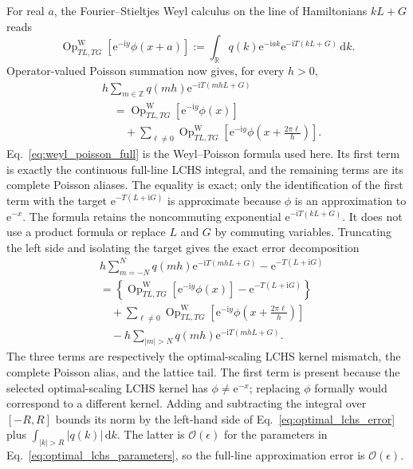 \documentclass[aps,pra,reprint,floatfix,unsortedaddress,superscriptaddress]{revtex4-2}
\newcommand{\abs}[1]{\left\lvert#1\right\rvert}
\newcommand{\Ocal}{\mathcal{O}}
\begin{document}
For real $a$, the Fourier--Stieltjes Weyl calculus on the line of
Hamiltonians $kL+G$ reads
\begin{equation}
\operatorname{Op}^{\mathrm W}_{TL,TG}
\!\left[\mathrm e^{-\mathrm iy}\phi(x+a)\right]
:=
\int_{\mathbb R}q(k)\mathrm e^{-\mathrm iak}
\mathrm e^{-\mathrm iT(kL+G)}\,\mathrm dk.
\label{eq:weyl_fourier_class}
\end{equation}
Operator-valued Poisson summation now gives, for every $h>0$,
\begin{align}
&h\sum_{m\in\mathbb Z}
q(mh)\mathrm e^{-\mathrm iT(mhL+G)}
\nonumber\\
&\quad=
\operatorname{Op}^{\mathrm W}_{TL,TG}
\!\left[\mathrm e^{-\mathrm iy}\phi(x)\right]
\nonumber\\
&\qquad+
\sum_{\ell\ne0}
\operatorname{Op}^{\mathrm W}_{TL,TG}
\!\left[
\mathrm e^{-\mathrm iy}
\phi\!\left(x+\frac{2\pi\ell}{h}\right)
\right].
\label{eq:weyl_poisson_full}
\end{align}
Eq.~\eqref{eq:weyl_poisson_full} is the Weyl--Poisson formula used
here.  Its first term is exactly the continuous full-line LCHS integral,
and the remaining terms are its complete Poisson aliases.  The equality
is exact; only the identification of the first term with the target
$\mathrm e^{-T(L+\mathrm iG)}$ is approximate because $\phi$ is an
approximation to $\mathrm e^{-x}$.
The formula retains the noncommuting exponential
$\mathrm e^{-\mathrm iT(kL+G)}$.  It does not use a product formula or
replace $L$ and $G$ by commuting variables.  Truncating the left side
and isolating the target gives the exact error decomposition
\begin{align}
    &h\sum_{m=-N}^{N}
    q(mh)\mathrm e^{-\mathrm iT(mhL+G)}
    -\mathrm e^{-T(L+\mathrm iG)}
    \nonumber\\
    &=
    \left\{
    \operatorname{Op}^{\mathrm W}_{TL,TG}
    \!\left[\mathrm e^{-\mathrm iy}\phi(x)\right]
    -\mathrm e^{-T(L+\mathrm iG)}
    \right\}
    \nonumber\\
    &\quad+
    \sum_{\ell\ne0}
    \operatorname{Op}^{\mathrm W}_{TL,TG}
    \!\left[
        \mathrm e^{-\mathrm iy}
        \phi\!\left(x+\frac{2\pi\ell}{h}\right)
    \right]
    \nonumber\\
    &\quad-
    h\sum_{\abs{m}>N}
    q(mh)\mathrm e^{-\mathrm iT(mhL+G)}.
    \label{eq:weyl_poisson_exact}
\end{align}
The three terms are respectively the optimal-scaling LCHS kernel
mismatch, the complete Poisson alias, and the lattice tail.  The first term is present
because the selected optimal-scaling LCHS kernel has
$\phi\neq\mathrm e^{-x}$; replacing $\phi$ formally would correspond to
a different kernel.  Adding and subtracting the integral over $[-R,R]$
bounds its norm by the left-hand side of
Eq.~\eqref{eq:optimal_lchs_error} plus
$\int_{\abs{k}>R}\abs{q(k)}\,\mathrm dk$.  The latter is
$\Ocal(\epsilon)$ for the parameters in
Eq.~\eqref{eq:optimal_lchs_parameters}, so the full-line approximation
error is
$\Ocal(\epsilon)$.
\end{document}

